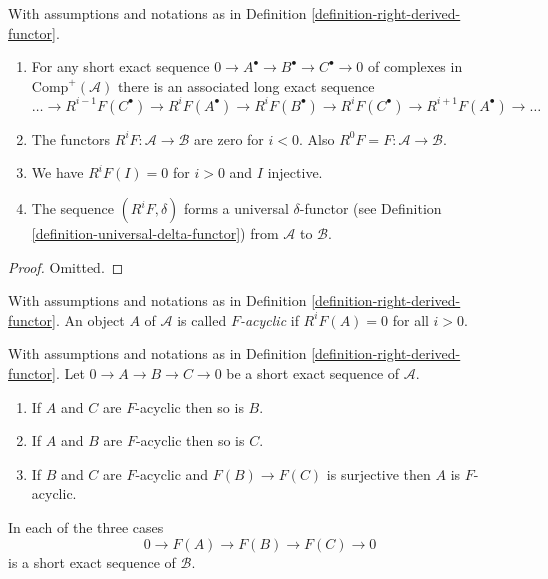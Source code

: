 \begin{lemma}
\label{lemma-higher-derived-functors}
With assumptions and notations as in
Definition \ref{definition-right-derived-functor}.
\begin{enumerate}
\item For any short exact sequence
$0 \to A^\bullet \to B^\bullet \to C^\bullet \to 0$
of complexes in $\text{Comp}^{+}(\mathcal{A})$ there
is an associated long exact sequence
$$
\ldots \to 
R^{i - 1}F(C^\bullet) \to
R^iF(A^\bullet) \to
R^iF(B^\bullet) \to
R^iF(C^\bullet) \to
R^{i + 1}F(A^\bullet) \to \ldots
$$
\item The functors $R^iF : \mathcal{A} \to \mathcal{B}$
are zero for $i < 0$. Also $R^0F = F : \mathcal{A} \to \mathcal{B}$.
\item We have $R^iF(I) = 0$ for $i > 0$ and $I$ injective.
\item The sequence $(R^iF, \delta)$ forms a universal $\delta$-functor
(see Definition \ref{definition-universal-delta-functor})
from $\mathcal{A}$ to $\mathcal{B}$.
\end{enumerate}
\end{lemma}

\begin{proof}
Omitted.
\end{proof}

\begin{definition}
\label{definition-F-acyclic}
With assumptions and notations as in
Definition \ref{definition-right-derived-functor}.
An object $A$ of $\mathcal{A}$ is called {\it $F$-acyclic}
if $R^iF(A) = 0$ for all $i > 0$.
\end{definition}

\begin{lemma}
\label{lemma-F-acyclic-ses}
With assumptions and notations as in
Definition \ref{definition-right-derived-functor}.
Let $0 \to A \to B \to C \to 0$ be a short exact sequence
of $\mathcal{A}$.
\begin{enumerate}
\item If $A$ and $C$ are $F$-acyclic then so is $B$.
\item If $A$ and $B$ are $F$-acyclic then so is $C$.
\item If $B$ and $C$ are $F$-acyclic and $F(B) \to F(C)$ is surjective
then $A$ is $F$-acyclic.
\end{enumerate}
In each of the three cases
$$
0 \to F(A) \to F(B) \to F(C) \to 0
$$
is a short exact sequence of $\mathcal{B}$.
\end{lemma}

